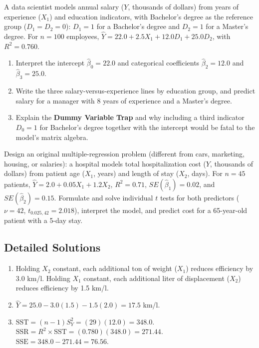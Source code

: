\begin{problema}
\label{prob:ee59291}
A data scientist models annual salary ($Y$, thousands of dollars) from years of experience ($X_1$) and education indicators, with Bachelor's degree as the reference group ($D_1=D_2=0$): $D_1=1$ for a Bachelor's degree and $D_2=1$ for a Master's degree. For $n=100$ employees, $\hat Y=22.0+2.5X_1+12.0D_1+25.0D_2$, with $R^2=0.760$.
\begin{enumerate}
\item Interpret the intercept $\hat\beta_0=22.0$ and categorical coefficients $\hat\beta_2=12.0$ and $\hat\beta_3=25.0$.
\item Write the three salary-versus-experience lines by education group, and predict salary for a manager with 8 years of experience and a Master's degree.
\item Explain the \textbf{Dummy Variable Trap} and why including a third indicator $D_0=1$ for Bachelor's degree together with the intercept would be fatal to the model's matrix algebra.
\end{enumerate}
\end{problema}

\begin{problema}
\label{prob:a6a21c3}
Design an original multiple-regression problem (different from cars, marketing, housing, or salaries): a hospital models total hospitalization cost ($Y$, thousands of dollars) from patient age ($X_1$, years) and length of stay ($X_2$, days). For $n=45$ patients, $\hat Y=2.0+0.05X_1+1.2X_2$, $R^2=0.71$, $SE(\hat\beta_1)=0.02$, and $SE(\hat\beta_2)=0.15$. Formulate and solve individual $t$ tests for both predictors ($\nu=42$, $t_{0.025,42}=2.018$), interpret the model, and predict cost for a 65-year-old patient with a 5-day stay.
\end{problema}

\subsection*{Detailed Solutions}

\begin{solproblema}[prob:0d6ff67]
\begin{enumerate}
\item Holding $X_2$ constant, each additional ton of weight ($X_1$) reduces efficiency by 3.0 km/l. Holding $X_1$ constant, each additional liter of displacement ($X_2$) reduces efficiency by 1.5 km/l.
\item $\hat Y=25.0-3.0(1.5)-1.5(2.0)=17.5$ km/l.
\item $\text{SST}=(n-1)S_Y^2=(29)(12.0)=348.0$. $\text{SSR}=R^2\times\text{SST}=(0.780)(348.0)=271.44$. $\text{SSE}=348.0-271.44=76.56$.
\end{enumerate}
\end{solproblema}

